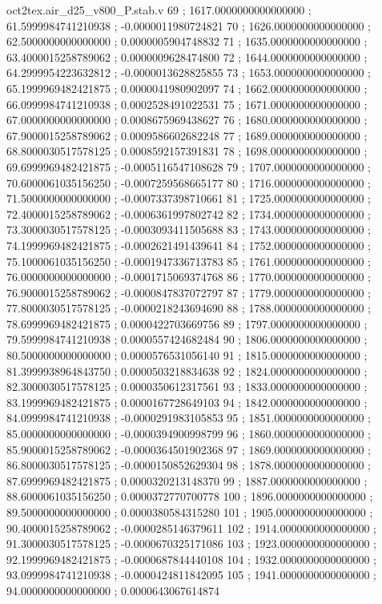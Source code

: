 \begin{filecontents}[overwrite]{oct2tex.air_d25_v800_P.stab.v}
69 ; 1617.0000000000000000 ; 61.5999984741210938 ; -0.0000011980724821
70 ; 1626.0000000000000000 ; 62.5000000000000000 ; 0.0000005904748832
71 ; 1635.0000000000000000 ; 63.4000015258789062 ; 0.0000009628474800
72 ; 1644.0000000000000000 ; 64.2999954223632812 ; -0.0000013628825855
73 ; 1653.0000000000000000 ; 65.1999969482421875 ; 0.0000041980902097
74 ; 1662.0000000000000000 ; 66.0999984741210938 ; 0.0002528491022531
75 ; 1671.0000000000000000 ; 67.0000000000000000 ; 0.0008675969438627
76 ; 1680.0000000000000000 ; 67.9000015258789062 ; 0.0009586602682248
77 ; 1689.0000000000000000 ; 68.8000030517578125 ; 0.0008592157391831
78 ; 1698.0000000000000000 ; 69.6999969482421875 ; -0.0005116547108628
79 ; 1707.0000000000000000 ; 70.6000061035156250 ; -0.0007259568665177
80 ; 1716.0000000000000000 ; 71.5000000000000000 ; -0.0007337398710661
81 ; 1725.0000000000000000 ; 72.4000015258789062 ; -0.0006361997802742
82 ; 1734.0000000000000000 ; 73.3000030517578125 ; -0.0003093411505688
83 ; 1743.0000000000000000 ; 74.1999969482421875 ; -0.0002621491439641
84 ; 1752.0000000000000000 ; 75.1000061035156250 ; -0.0001947336713783
85 ; 1761.0000000000000000 ; 76.0000000000000000 ; -0.0001715069374768
86 ; 1770.0000000000000000 ; 76.9000015258789062 ; -0.0000847837072797
87 ; 1779.0000000000000000 ; 77.8000030517578125 ; -0.0000218243694690
88 ; 1788.0000000000000000 ; 78.6999969482421875 ; 0.0000422703669756
89 ; 1797.0000000000000000 ; 79.5999984741210938 ; 0.0000557424682484
90 ; 1806.0000000000000000 ; 80.5000000000000000 ; 0.0000576531056140
91 ; 1815.0000000000000000 ; 81.3999938964843750 ; 0.0000503218834638
92 ; 1824.0000000000000000 ; 82.3000030517578125 ; 0.0000350612317561
93 ; 1833.0000000000000000 ; 83.1999969482421875 ; 0.0000167728649103
94 ; 1842.0000000000000000 ; 84.0999984741210938 ; -0.0000291983105853
95 ; 1851.0000000000000000 ; 85.0000000000000000 ; -0.0000394900998799
96 ; 1860.0000000000000000 ; 85.9000015258789062 ; -0.0000364501902368
97 ; 1869.0000000000000000 ; 86.8000030517578125 ; -0.0000150852629304
98 ; 1878.0000000000000000 ; 87.6999969482421875 ; 0.0000320213148370
99 ; 1887.0000000000000000 ; 88.6000061035156250 ; 0.0000372770700778
100 ; 1896.0000000000000000 ; 89.5000000000000000 ; 0.0000380584315280
101 ; 1905.0000000000000000 ; 90.4000015258789062 ; -0.0000285146379611
102 ; 1914.0000000000000000 ; 91.3000030517578125 ; -0.0000670325171086
103 ; 1923.0000000000000000 ; 92.1999969482421875 ; -0.0000687844440108
104 ; 1932.0000000000000000 ; 93.0999984741210938 ; -0.0000424811842095
105 ; 1941.0000000000000000 ; 94.0000000000000000 ; 0.0000643067614874

\end{filecontents}
